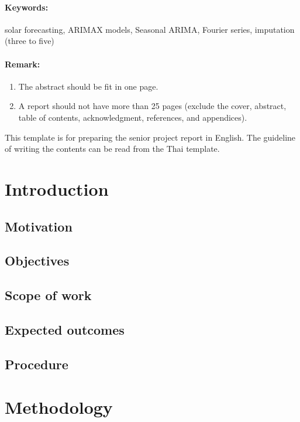 \documentclass[11pt,a4paper]{article}
\begin{document}
\paragraph{\textbf Keywords:} solar forecasting, ARIMAX models, Seasonal ARIMA, Fourier series, imputation (three to five)

\paragraph{\textbf Remark:}
\begin{enumerate}
\item The abstract should be fit in one page.
\item A report should not have more than 25 pages (exclude the cover, abstract, table of contents, acknowledgment, references, and appendices).
\end{enumerate}

This template is for preparing the senior project report in English. The guideline of writing the contents can be read from the Thai template.

\newpage
\thispagestyle{empty}
\tableofcontents

\newpage
\setcounter{page}{1}
\section{Introduction}

\subsection{Motivation}

\subsection{Objectives}

\subsection{Scope of work}

\subsection{Expected outcomes}

\subsection{Procedure}

\section{Methodology}
\end{document}

